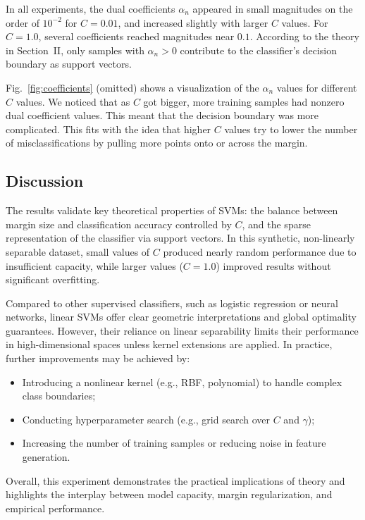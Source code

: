 \documentclass[conference]{IEEEtran}
\begin{document}
	In all experiments, the dual coefficients $\alpha_n$ appeared in small magnitudes on the order of $10^{-2}$ for $C = 0.01$, and increased slightly with larger $C$ values. For $C = 1.0$, several coefficients reached magnitudes near $0.1$. According to the theory in Section~II, only samples with $\alpha_n > 0$ contribute to the classifier’s decision boundary as support vectors.
	
	Fig.~\ref{fig:coefficients} (omitted) shows a visualization of the $\alpha_n$ values for different $C$ values. We noticed that as $C$ got bigger, more training samples had nonzero dual coefficient values. This meant that the decision boundary was more complicated. This fits with the idea that higher $C$ values try to lower the number of misclassifications by pulling more points onto or across the margin.
	
	\subsection{Discussion}
	
	The results validate key theoretical properties of SVMs: the balance between margin size and classification accuracy controlled by $C$, and the sparse representation of the classifier via support vectors. In this synthetic, non-linearly separable dataset, small values of $C$ produced nearly random performance due to insufficient capacity, while larger values ($C=1.0$) improved results without significant overfitting.
	
	Compared to other supervised classifiers, such as logistic regression or neural networks, linear SVMs offer clear geometric interpretations and global optimality guarantees. However, their reliance on linear separability limits their performance in high-dimensional spaces unless kernel extensions are applied. In practice, further improvements may be achieved by:
	\begin{itemize}
		\item Introducing a nonlinear kernel (e.g., RBF, polynomial) to handle complex class boundaries;
		\item Conducting hyperparameter search (e.g., grid search over $C$ and $\gamma$);
		\item Increasing the number of training samples or reducing noise in feature generation.
	\end{itemize}
	
	Overall, this experiment demonstrates the practical implications of theory and highlights the interplay between model capacity, margin regularization, and empirical performance.
	
\end{document}
